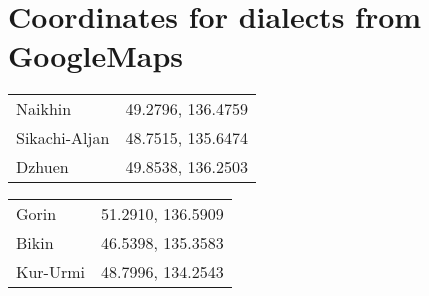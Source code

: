 \documentclass[output=paper,colorlinks,citecolor=brown]{langscibook}
\begin{document}
\section*{Coordinates for dialects from GoogleMaps}

\begin{tabularx}{.45\textwidth}{l@{~}Q}
    Naikhin & 49.2796, 136.4759\\
    Sikachi-Aljan & 48.7515, 135.6474\\
    Dzhuen & 49.8538, 136.2503\\
\end{tabularx}
\begin{tabularx}{.45\textwidth}{l@{~}Q}
    Gorin & 51.2910, 136.5909\\
    Bikin & 46.5398, 135.3583\\
    Kur-Urmi & 48.7996, 134.2543\\
\end{tabularx}

\clearpage
{\sloppy\printbibliography[heading=subbibliography,notkeyword=this]}
\end{document}
